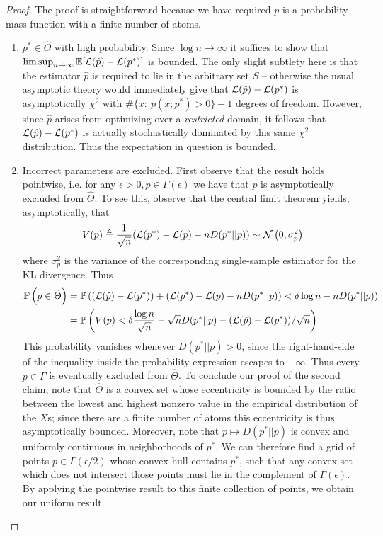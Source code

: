 \documentclass{article}
\theoremstyle{definition}
\begin{document}
\begin{proof}  The proof is straightforward because we have required $p$ is a probability mass function with a finite number of atoms.  
\begin{enumerate}
    \item $p^* \in \hat \Theta$ with high probability. Since $\log n\rightarrow \infty$ it suffices to show that $\limsup_{n\rightarrow\infty} \mathbb{E}[\mathcal{L}(\hat p)- \mathcal{L}(p^*)]$ is bounded.  The only slight subtlety here is that the estimator $\hat p$ is required to lie in the arbitrary set $S$ -- otherwise the usual asymptotic theory would immediately give that $\mathcal{L}(\hat p)- \mathcal{L}(p^*)$ is asymptotically $\chi^2$ with $\#\{x:\ p(x;p^*)>0\}-1$ degrees of freedom.  However, since $\hat p$ arises from optimizing over a \emph{restricted} domain, it follows that $\mathcal{L}(\hat p)- \mathcal{L}(p^*)$ is actually stochastically dominated by this same $\chi^2$ distribution.  Thus the expectation in question is bounded.
    
    \item Incorrect parameters are excluded.  First observe that the result holds pointwise, i.e. for any $\epsilon>0,p \in \Gamma(\epsilon)$ we have that $p$ is asymptotically excluded from $\hat \Theta$.  To see this, observe that the central limit theorem yields, asymptotically, that
    \[
    V(p) \triangleq \frac{1}{\sqrt{n}} (\mathcal{L}(p^*) - \mathcal{L}(p) - nD(p^*||p)) \sim \mathcal N\left(0,\sigma^2_p\right)
    \]
    where $\sigma^2_p$ is the variance of the corresponding single-sample estimator for the KL divergence.   Thus   
    \begin{align*}
    \mathbb{P}\left(p \in \hat \Theta\right) 
        &=\mathbb{P}\left((\mathcal{L}(\hat p) - \mathcal{L}(p^*))+ (\mathcal{L}(p^*) - \mathcal{L}(p) -nD(p^*||p)) < \delta \log n - nD(p^*||p)\right)\\ 
        &=\mathbb{P}\left(V(p) < \delta \frac{\log n}{\sqrt n} - \sqrt{n}D(p^*||p) - (\mathcal{L}(\hat p) - \mathcal{L}(p^*))/\sqrt{n}\right) 
    \end{align*}
    This probability vanishes whenever $D(p^*||p)>0$, since the right-hand-side of the inequality inside the probability expression escapes to $-\infty$.  Thus every $p \in \Gamma$ is eventually excluded from $\hat \Theta$.  To conclude our proof of the second claim, note that $\hat \Theta$ is a convex set whose eccentricity is bounded by the ratio between the lowest and highest nonzero value in the empirical distribution of the $X$s; since there are a finite number of atoms this eccentricity is thus asymptotically bounded.  Moreover, note that $p \mapsto D(p^*||p)$ is convex and uniformly continuous in neighborhoods of $p^*$.   We can therefore find a grid of points $p\in \Gamma(\epsilon/2)$ whose convex hull contains $p^*$, such that any convex set which does not intersect those points must lie in the complement of $\Gamma(\epsilon)$.  By applying the pointwise result to this finite collection of points, we obtain our uniform result.

\end{enumerate}
\end{proof}
\end{document}
